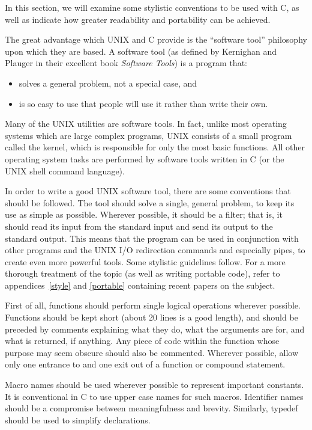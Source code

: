      In this section, we will examine some stylistic conventions to
be used with C, as well as indicate how greater readability and
portability can be achieved.

     The great  advantage which  UNIX and  C provide  is the 
``software tool'' philosophy upon which they are based. A software
tool (as defined by Kernighan and Plauger in their excellent book 
{\em Software Tools\/}) is a program that:
\begin{itemize}
\item  solves a general problem, not a special case, and
\item  is so easy to use that people will use it rather than write their
own.
\end{itemize}
     Many of  the UNIX  utilities are  software tools.  In fact, 
unlike  most operating systems  which are  large complex programs,
UNIX consists of a small program called  the {\kc kernel},  which is 
responsible for  only  the  most  basic functions. All other
operating system tasks are performed by software tools written in C (or
the UNIX shell command language).

     In order  to write  a good UNIX software tool, there are some
conventions that should  be followed.  The tool should solve a
single, general problem, to keep its  use as simple as possible.
Wherever possible, it should be a {\kc filter}; that is,  it should
read its input from the standard input and send its output to the
standard output. This means that the program can be used in
conjunction with other  programs and the UNIX I/O redirection
commands and especially pipes, to create even more powerful tools. 
Some stylistic guidelines follow.  For a more thorough treatment of the
topic (as well as writing portable code), refer to appendices~\ref{style}
and \ref{portable} containing recent papers on the subject.

     First of all, functions should perform 
single logical operations
wherever possible. Functions  should be  kept short  (about 20 lines
is a good length), and should be preceded by comments explaining what
they do, what the arguments are for,  and what  is returned,  if
anything.  Any piece  of code  within the function whose  purpose
may  seem obscure  should also  be commented. Wherever possible,
allow  only one  entrance to  and one exit out of a function or compound
statement.

     Macro names  should be  used wherever  possible  to  represent 
important constants. It  is conventional  in C  to use upper case
names for such macros.  Identifier names  should be  a compromise 
between meaningfulness and brevity.  Similarly, {\cd typedef} should
be used to simplify declarations.

